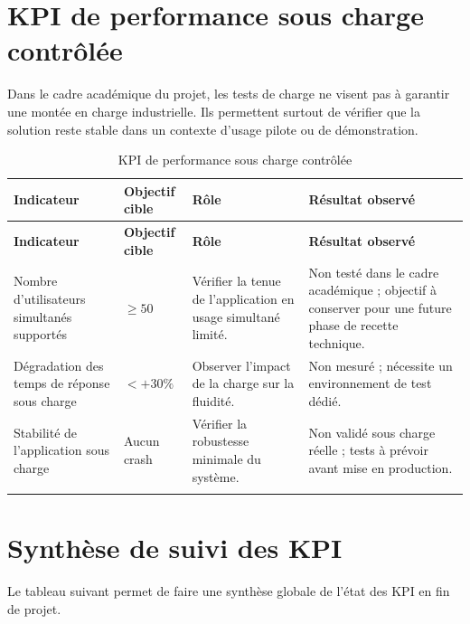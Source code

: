\section{KPI de performance sous charge contrôlée}

Dans le cadre académique du projet, les tests de charge ne visent pas à garantir une montée en charge industrielle. 
Ils permettent surtout de vérifier que la solution reste stable dans un contexte d'usage pilote ou de démonstration.

\begin{longtable}{|p{5cm}|p{3cm}|p{4cm}|p{2.5cm}|}
\hline
\rowcolor{purple!15}
\textbf{Indicateur} & \textbf{Objectif cible} & \textbf{Rôle} & \textbf{Résultat observé} \\
\hline
\endfirsthead

\hline
\rowcolor{purple!15}
\textbf{Indicateur} & \textbf{Objectif cible} & \textbf{Rôle} & \textbf{Résultat observé} \\
\hline
\endhead

Nombre d'utilisateurs simultanés supportés 
& $\geq 50$ 
& Vérifier la tenue de l'application en usage simultané limité. 
& Non testé dans le cadre académique ; objectif à conserver pour une future phase de recette technique. \\
\hline

Dégradation des temps de réponse sous charge 
& $< +30\%$ 
& Observer l'impact de la charge sur la fluidité. 
& Non mesuré ; nécessite un environnement de test dédié. \\
\hline

Stabilité de l'application sous charge 
& Aucun crash 
& Vérifier la robustesse minimale du système. 
& Non validé sous charge réelle ; tests à prévoir avant mise en production. \\
\hline

\caption{KPI de performance sous charge contrôlée}
\label{tab:kpi-charge}
\end{longtable}

\section{Synthèse de suivi des KPI}

Le tableau suivant permet de faire une synthèse globale de l'état des KPI en fin de projet.


